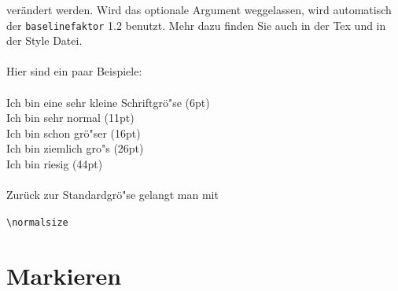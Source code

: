\noindent verändert werden. Wird das optionale Argument weggelassen, wird automatisch der \texttt{baselinefaktor} 1.2 benutzt. Mehr dazu finden Sie auch in der Tex und in der Style Datei.\\
\\
Hier sind ein paar Beispiele:\\
\\
 Ich bin eine sehr kleine Schriftgrö"se (6pt)\\
 Ich bin sehr normal (11pt)\\
 Ich bin schon grö"ser (16pt)\\
 Ich bin ziemlich gro"s (26pt)\\
 Ich bin riesig (44pt)%
%
\normalsize\\
\\
Zurück zur Standardgrö"se gelangt man mit

\begin{center}
\texttt{\textbackslash normalsize}
\end{center}

\newpage



\section{Markieren}


